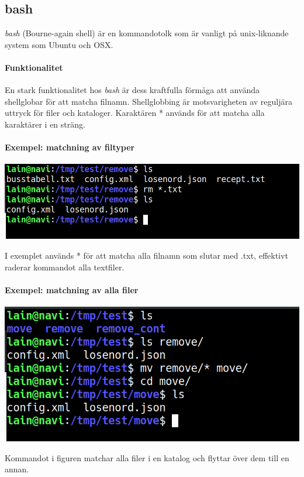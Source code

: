 \subsection{bash}
\emph{bash} (Bourne-again shell) är en kommandotolk som är vanligt på unix-liknande system som Ubuntu och OSX. 
\paragraph{Funktionalitet}
En stark funktionalitet hos \emph{bash} är dess kraftfulla förmåga att använda shellglobar för att matcha filnamn.
Shellglobbing är motsvarigheten av reguljära uttryck för filer och kataloger. Karaktären * används för att matcha alla karaktärer i en sträng.
\paragraph{Exempel: matchning av filtyper}
\begin{center}
        \includegraphics[width=\linewidth]{bilder/bash_remove_filetype.png}
\end{center}
I exemplet används * för att matcha alla filnamn som slutar med .txt, effektivt raderar kommandot alla textfiler.
\paragraph{Exempel: matchning av alla filer}
\begin{center}
        \includegraphics[width=\linewidth]{bilder/bash_move_files.png}
\end{center}
Kommandot i figuren matchar alla filer i en katalog och flyttar över dem till en annan.
